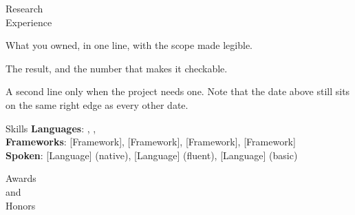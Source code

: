 \documentclass[fontset=commercial,pagefooter=false]{yuan2resume}
\begin{document}
\begin{cvtwocolumn}
\begin{cvsection}{Research\\Experience}
  \begin{cvitemize}
    \item What you owned, in one line, with the scope made legible.
  \end{cvitemize}
  \begin{cventry}
    \begin{cvitemize}
      \item The result, and the number that makes it checkable.
      \item A second line only when the project needs one. Note that the date
        above still sits on the same right edge as every other date.
    \end{cvitemize}
  \end{cventry}
\end{cvsection}

\begin{cvsection}{Skills}
  \textbf{Languages}: {\CodeFont{[Lang]}}, {\CodeFont{[Lang]}}, {\CodeFont{[Lang]}} \\
  \textbf{Frameworks}: [Framework], [Framework], [Framework], [Framework] \\
  \textbf{Spoken}: [Language] (native), [Language] (fluent), [Language] (basic)
\end{cvsection}

\begin{cvsection}{Awards\\and\\Honors}
\end{cvsection}

\end{cvtwocolumn}
\end{document}
